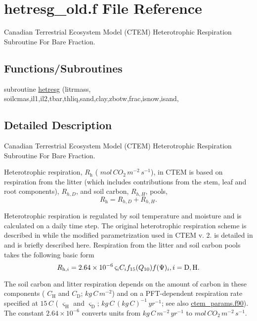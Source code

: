 \hypertarget{hetresg__old_8f}{}\section{hetresg\+\_\+old.\+f File Reference}
\label{hetresg__old_8f}


Canadian Terrestrial Ecosystem Model (C\+T\+E\+M) Heterotrophic Respiration Subroutine For Bare Fraction.  


\subsection*{Functions/\+Subroutines}
\begin{DoxyCompactItemize}
\item 
subroutine \hyperlink{hetresg__old_8f_abc05c909fea03987862d6cf0dd3c5a0c}{hetresg} (litrmass, soilcmas,il1,il2,tbar,thliq,sand,clay,zbotw,frac,isnow,isand,
\end{DoxyCompactItemize}


\subsection{Detailed Description}
Canadian Terrestrial Ecosystem Model (C\+T\+E\+M) Heterotrophic Respiration Subroutine For Bare Fraction. 

Heterotrophic respiration, $R_\mathrm{h}$ ( $mol\,CO_2\,m^{-2}\,s^{-1}$), in C\+T\+E\+M is based on respiration from the litter (which includes contributions from the stem, leaf and root components), $R_{h,D}$, and soil carbon, $R_{h,H}$, pools, \[ \label{hetres_all} R_\mathrm{h}=R_{h,D}+R_{h,H}. \]

Heterotrophic respiration is regulated by soil temperature and moisture and is calculated on a daily time step. The original heterotrophic respiration scheme is described in \cite{Arora2003-3b7} while the modified parametrization used in C\+T\+E\+M v. 2. is detailed in \cite{Melton2014-xy} and is briefly described here. Respiration from the litter and soil carbon pools takes the following basic form \[ R_{\mathrm{h},i} = 2.64 \times 10^{-6}\,\varsigma_i C_i f_{15}(Q_{10}) f(\Psi)_i,\nonumber \\ i = \mathrm{D}, \mathrm{H}.\label{lithet} \]

The soil carbon and litter respiration depends on the amount of carbon in these components ( $C_\mathrm{H}$ and $C_\mathrm{D}$; $kg\,C\,m^{-2}$) and on a P\+F\+T-\/dependent respiration rate specified at $15\,{C}$ ( $\varsigma_\mathrm{H}$ and $\varsigma_\mathrm{D}$; $kg\,C\,(kg\,C)^{-1}\,yr^{-1}$; see also \hyperlink{ctem__params_8f90}{ctem\+\_\+params.\+f90}). The constant $2.64 \times 10^{-6}$ converts units from $kg\,C\,m^{-2}\,yr^{-1}$ to $mol\,CO_2\,m^{-2}\,s^{-1}$.

